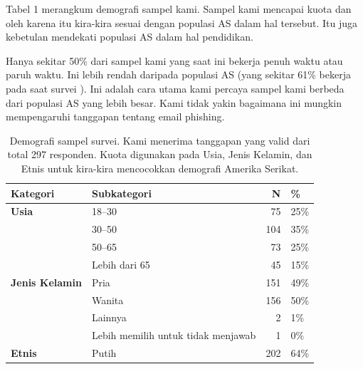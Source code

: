 \documentclass[lettersize,journal]{IEEEtran}
\begin{document}
Tabel 1 merangkum demografi sampel kami. Sampel kami mencapai kuota dan oleh
karena itu kira-kira sesuai dengan populasi AS dalam hal tersebut. Itu juga
kebetulan mendekati populasi AS dalam hal pendidikan.

Hanya sekitar 50\% dari sampel kami yang saat ini bekerja penuh waktu atau
paruh waktu. Ini lebih rendah daripada populasi AS (yang sekitar 61\% bekerja
pada saat survei \cite{duaempat}). Ini adalah cara utama kami percaya sampel
kami berbeda dari populasi AS yang lebih besar. Kami tidak yakin bagaimana ini
mungkin mempengaruhi tanggapan tentang email phishing.

\begin{table}[h!]
  \centering
  \caption{Demografi sampel survei. Kami menerima tanggapan yang valid dari total 297 responden. Kuota digunakan pada Usia, Jenis Kelamin, dan Etnis untuk kira-kira mencocokkan demografi Amerika Serikat.}
  \begin{tabular}{@{}llrl@{}}
    \toprule
    \textbf{Kategori}                              & \textbf{Subkategori}                     & \textbf{N} & \textbf{\%} \\ \midrule
    \textbf{Usia}                                  & 18--30                                   & 75         & 25\%        \\
                                                   & 30--50                                   & 104        & 35\%        \\
                                                   & 50--65                                   & 73         & 25\%        \\
                                                   & Lebih dari 65                            & 45         & 15\%        \\ \midrule
    \textbf{Jenis Kelamin}                         & Pria                                     & 151        & 49\%        \\
                                                   & Wanita                                   & 156        & 50\%        \\
                                                   & Lainnya                                  & 2          & 1\%         \\
                                                   & Lebih memilih untuk tidak menjawab       & 1          & 0\%         \\ \midrule
    \textbf{Etnis}                                 & Putih                                    & 202        & 64\%        \\

\end{tabular}
\end{table}
\end{document}
